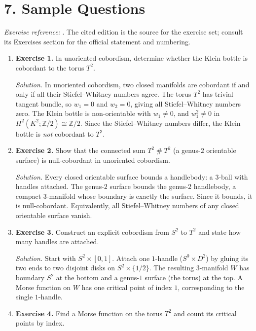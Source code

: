\section*{7. Sample Questions}
\emph{Exercise reference:} \cite{cobordism_theory_ref1}. The cited edition is the source for the exercise set; consult its Exercises section for the official statement and numbering.
\begin{enumerate}[leftmargin=*,itemsep=0.9em]

\item \textbf{Exercise 1.} In unoriented cobordism, determine whether the Klein bottle is cobordant to the torus $T^2$.

\emph{Solution.} In unoriented cobordism, two closed manifolds are cobordant if and only if all their Stiefel--Whitney numbers agree. The torus $T^2$ has trivial tangent bundle, so $w_1=0$ and $w_2=0$, giving all Stiefel--Whitney numbers zero. The Klein bottle is non-orientable with $w_1\neq 0$, and $w_1^2\neq 0$ in $H^2(K^2;\mathbb{Z}/2)\cong\mathbb{Z}/2$. Since the Stiefel--Whitney numbers differ, the Klein bottle is \emph{not} cobordant to $T^2$.

\item \textbf{Exercise 2.} Show that the connected sum $T^2\mathbin{\#} T^2$ (a genus-$2$ orientable surface) is null-cobordant in unoriented cobordism.

\emph{Solution.} Every closed orientable surface bounds a handlebody: a $3$-ball with handles attached. The genus-$2$ surface bounds the genus-$2$ handlebody, a compact $3$-manifold whose boundary is exactly the surface. Since it bounds, it is null-cobordant. Equivalently, all Stiefel--Whitney numbers of any closed orientable surface vanish.

\item \textbf{Exercise 3.} Construct an explicit cobordism from $S^2$ to $T^2$ and state how many handles are attached.

\emph{Solution.} Start with $S^2\times[0,1]$. Attach one $1$-handle ($S^0\times D^2$) by gluing its two ends to two disjoint disks on $S^2\times\{1/2\}$. The resulting $3$-manifold $W$ has boundary $S^2$ at the bottom and a genus-$1$ surface (the torus) at the top. A Morse function on $W$ has one critical point of index $1$, corresponding to the single $1$-handle.

\item \textbf{Exercise 4.} Find a Morse function on the torus $T^2$ and count its critical points by index.


\end{enumerate}
